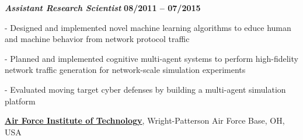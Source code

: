 \begin{outerlist}

\item[] {\normalsize \textbf{\textit{Assistant Research Scientist}}}%
\hfill \textbf{08/2011 -- 07/2015}

\begin{innerlist}

\item[-] Designed and implemented novel machine learning algorithms to educe human and machine behavior from network protocol traffic

\item[-] Planned and implemented cognitive multi-agent systems to perform high-fidelity network traffic generation for network-scale simulation experiments

\item[-] Evaluated moving target cyber defenses by building a multi-agent simulation platform

%
%
%

%
%

\end{innerlist}
\end{outerlist}

\halfblankline

\href{http://www.ll.mit.edu/}{\textbf{Air Force Institute of Technology}},
Wright-Patterson Air Force Base, OH, USA

